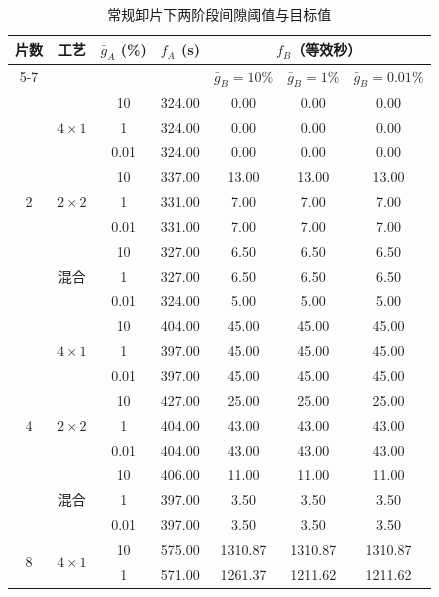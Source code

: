 \documentclass[final,5p,times,twocolumn]{elsarticle}
\begin{document}
\begin{table}[!t]
\centering\footnotesize
\caption{常规卸片下两阶段间隙阈值与目标值}
\label{tab:certified-grid-cn}
\setlength{\tabcolsep}{2.4pt}
\renewcommand{\arraystretch}{1.0}
\begin{tabular}{@{}ccccccc@{}}\toprule
\multirow{2}{*}{片数} & \multirow{2}{*}{工艺} & \multirow{2}{*}{$\bar g_A$ (\%)} & \multirow{2}{*}{$f_A$ (s)} & \multicolumn{3}{c}{$f_B$（等效秒）}\\
\cmidrule(l){5-7}
 & & & & $\bar g_B{=}10\%$ & $\bar g_B{=}1\%$ & $\bar g_B{=}0.01\%$\\\midrule
\multirow{9}{*}{2} & \multirow{3}{*}{$4\times1$} & 10 & 324.00 & 0.00 & 0.00 & 0.00\\
 &  & 1 & 324.00 & 0.00 & 0.00 & 0.00\\
 &  & 0.01 & 324.00 & 0.00 & 0.00 & 0.00\\
\cmidrule(l){2-7}
 & \multirow{3}{*}{$2\times2$} & 10 & 337.00 & 13.00 & 13.00 & 13.00\\
 &  & 1 & 331.00 & 7.00 & 7.00 & 7.00\\
 &  & 0.01 & 331.00 & 7.00 & 7.00 & 7.00\\
\cmidrule(l){2-7}
 & \multirow{3}{*}{混合} & 10 & 327.00 & 6.50 & 6.50 & 6.50\\
 &  & 1 & 327.00 & 6.50 & 6.50 & 6.50\\
 &  & 0.01 & 324.00 & 5.00 & 5.00 & 5.00\\
\midrule
\multirow{9}{*}{4} & \multirow{3}{*}{$4\times1$} & 10 & 404.00 & 45.00 & 45.00 & 45.00\\
 &  & 1 & 397.00 & 45.00 & 45.00 & 45.00\\
 &  & 0.01 & 397.00 & 45.00 & 45.00 & 45.00\\
\cmidrule(l){2-7}
 & \multirow{3}{*}{$2\times2$} & 10 & 427.00 & 25.00 & 25.00 & 25.00\\
 &  & 1 & 404.00 & 43.00 & 43.00 & 43.00\\
 &  & 0.01 & 404.00 & 43.00 & 43.00 & 43.00\\
\cmidrule(l){2-7}
 & \multirow{3}{*}{混合} & 10 & 406.00 & 11.00 & 11.00 & 11.00\\
 &  & 1 & 397.00 & 3.50 & 3.50 & 3.50\\
 &  & 0.01 & 397.00 & 3.50 & 3.50 & 3.50\\
\midrule
\multirow{9}{*}{8} & \multirow{3}{*}{$4\times1$} & 10 & 575.00 & 1310.87 & 1310.87 & 1310.87\\
 &  & 1 & 571.00 & 1261.37 & 1211.62 & 1211.62\\

\end{tabular}
\end{table}
\end{document}
